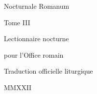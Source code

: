 \documentclass[twoside, french]{book}
\begin{document}
\begin{titlepage}
\begin{center}
\null\vspace{2cm}
{\Large Nocturnale Romanum}

\vspace{5mm}

{\large Tome III}

\vspace{5cm}

{\Huge Lectionnaire nocturne}

\vspace{1cm}

{\Large pour l'Office romain}

\vfill

Traduction officielle liturgique

\vspace{5mm}

MMXXII

\end{center}
\end{titlepage}
\end{document}
